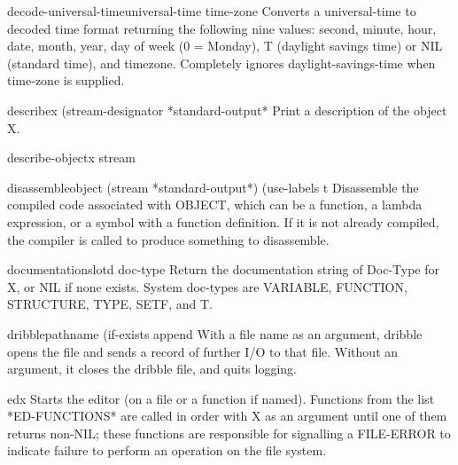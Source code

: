 \begin{function}{decode-universal-time}{universal-time \op time-zone}{}
  Converts a universal-time to decoded time format returning the following
   nine values: second, minute, hour, date, month, year, day of week (0 =
   Monday), T (daylight savings time) or NIL (standard time), and timezone.
   Completely ignores daylight-savings-time when time-zone is supplied.
\end{function}

\begin{function}{describe}{x \op (stream-designator *standard-output*}{}
  Print a description of the object X.
\end{function}

\begin{generic}{describe-object}{x stream}{}
  
\end{generic}

\begin{function}{disassemble}{object \key (stream *standard-output*) (use-labels t}{}
  Disassemble the compiled code associated with OBJECT, which can be a
  function, a lambda expression, or a symbol with a function definition. If
  it is not already compiled, the compiler is called to produce something to
  disassemble.
\end{function}

\begin{generic}{documentation}{slotd doc-type}{}
  Return the documentation string of Doc-Type for X, or NIL if
  none exists. System doc-types are VARIABLE, FUNCTION, STRUCTURE, TYPE,
  SETF, and T.
\end{generic}

\begin{function}{dribble}{\op pathname \key (if-exists append}{}
  With a file name as an argument, dribble opens the file and sends a
  record of further I/O to that file. Without an argument, it closes
  the dribble file, and quits logging.
\end{function}

\begin{function}{ed}{\op x}{}
  Starts the editor (on a file or a function if named).  Functions
from the list *ED-FUNCTIONS* are called in order with X as an argument
until one of them returns non-NIL; these functions are responsible for
signalling a FILE-ERROR to indicate failure to perform an operation on
the file system.
\end{function}

